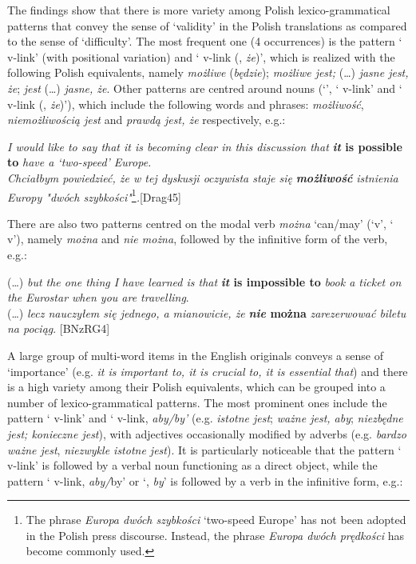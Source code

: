 \documentclass[output=paper]{langscibook}
\begin{document}
The findings show that there is more variety among Polish lexico-grammatical patterns that convey the sense of ‘validity’ in the Polish translations as compared to the sense of ‘difficulty’. The most frequent one (4 occurrences) is the pattern ‘{\ADJ} v-link’ (with positional variation) and ‘{\ADJ} v-link (, \textit{że})’, which is realized with the following Polish equivalents, namely \textit{możliwe} (\textit{będzie}); \textit{możliwe jest;} (…) \textit{jasne jest, że}; \textit{jest} (…) \textit{jasne, że}. Other patterns are centred around nouns (‘{\NN}’, ‘{\NN} v-link’ and ‘{\NN} v-link (, \textit{że})’), which include the following words and phrases: \textit{możliwość}, \textit{niemożliwością jest} and \textit{prawdą jest, że} respectively, e.g.:

\ea
 \textit{I would like to say that it is becoming clear in this discussion that} \textbf{\textit{it} \textbf{is} \textbf{possible} \textbf{to}} \textit{have a `two-speed' Europe.}\\
\textit{Chciałbym powiedzieć, że w tej dyskusji oczywista staje się} \textbf{\textit{możliwość}} \textit{istnienia Europy "dwóch szybkości"}\footnote{\textrm{The phrase} \textrm{\textit{Europa dwóch szybkości}} \textrm{‘two-speed Europe’ has not been adopted in the Polish press discourse. Instead, the phrase} \textrm{\textit{Europa dwóch prędkości}} \textrm{has become commonly used.} }\textit{.}[Drag45]
\z

\hspace*{-1.5mm}There are also two patterns centred on the modal verb \textit{można} ‘can/may’ (‘{\MOD}v’, ‘{\NEG} {\PRT} {\MOD}v’), namely \textit{można} and \textit{nie można}, followed by the infinitive form of the verb, e.g.:

\ea
 (…) \textit{but the one thing I have learned is that} \textbf{\textit{it} \textbf{is} \textbf{impossible} \textbf{to}} \textit{book a ticket on the Eurostar when you are travelling}.\\
 (…) \textit{lecz nauczyłem się jednego, a mianowicie, że} \textbf{\textit{nie} \textbf{można}} \textit{zarezerwować biletu na pociąg}. [BNzRG4]
\z

A large group of multi-word items in the English originals conveys a sense of ‘importance’ (e.g. \textit{it is important to, it is crucial to, it is essential that}) and there is a high variety among their Polish equivalents, which can be grouped into a number of lexico-grammatical patterns. The most prominent ones include the pattern ‘{\ADJ} v-link’ and ‘{\ADJ} v-link, \textit{aby/by’} (e.g. \textit{istotne jest}; \textit{ważne jest, aby}; \textit{niezbędne jest; konieczne jest}), with adjectives occasionally modified by adverbs (e.g. \textit{bardzo ważne jest}, \textit{niezwykle istotne jest}). It is particularly noticeable that the pattern ‘{\ADJ} v-link’ is followed by a verbal noun functioning as a direct object, while the pattern ‘{\ADJ} v-link, \textit{aby/}by’ or ‘{\ADJ}, \textit{by}’ is followed by a verb in the infinitive form, e.g.:
\end{document}
